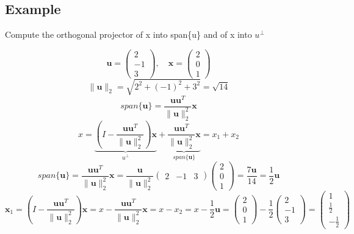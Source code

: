 \subsection*{Example}
Compute the orthogonal projector of x into span\{u\} and of x into $u^\perp$

$$ \mathbf{u} = \begin{pmatrix} 2 \\ -1 \\ 3 \end{pmatrix}, \quad \mathbf{x} = \begin{pmatrix} 2 \\ 0 \\ 1 \end{pmatrix} $$
$$ \| \mathbf{u} \|_2 = \sqrt{2^2 + (-1)^2 + 3^2} = \sqrt{14} $$
$$ span\{\mathbf{u}\} =  \frac{\mathbf{u}\mathbf{u}^T}{\| \mathbf{u} \|_2^2}\mathbf{x}$$
$$ x = \underbrace{(I - \frac{\mathbf{u}\mathbf{u}^T}{\| \mathbf{u} \|_2^2})\mathbf{x}}_{u^\perp} + \underbrace{\frac{\mathbf{u}\mathbf{u}^T}{\| \mathbf{u} \|_2^2}\mathbf{x}}_{span\{\mathbf{u}\}} = x_1 + x_2 $$
$$ span\{\mathbf{u}\} = \frac{\mathbf{u}\mathbf{u}^T}{\| \mathbf{u} \|_2^2}\mathbf{x} = \frac{\mathbf{u}}{\| \mathbf{u} \|_2^2} \begin{pmatrix} 2 & -1 & 3 \end{pmatrix} \begin{pmatrix} 2 \\ 0 \\ 1 \end{pmatrix} = \frac{7\mathbf{u}}{14} = \frac{1}{2}\mathbf{u} $$
$$ \mathbf{x}_1 = (I - \frac{\mathbf{u}\mathbf{u}^T}{\| \mathbf{u} \|_2^2})\mathbf{x} = x - \frac{\mathbf{u}\mathbf{u}^T}{\| \mathbf{u} \|_2^2}\mathbf{x} = x - x_2 = x - \frac{1}{2}\mathbf{u} = \begin{pmatrix}
    2 \\ 0 \\ 1
\end{pmatrix} - \frac{1}{2} \begin{pmatrix}
    2 \\ -1 \\ 3
\end{pmatrix} = \begin{pmatrix}
    1 \\ \frac{1}{2} \\ -\frac{1}{2}
\end{pmatrix} $$

